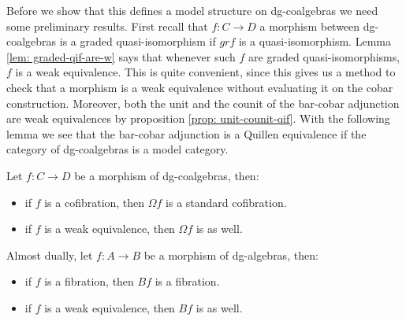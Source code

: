 \documentclass[../thesis.tex]{subfiles}
\begin{document}
            Before we show that this defines a model structure on dg-coalgebras we need some preliminary results. First recall that $f : C \rightarrow D$ a morphism between dg-coalgebras is a graded quasi-isomorphism if $grf$ is a quasi-isomorphism. Lemma \ref{lem: graded-qif-are-w} says that whenever such $f$ are graded quasi-isomorphisms, $f$ is a weak equivalence. This is quite convenient, since this gives us a method to check that a morphism is a weak equivalence without evaluating it on the cobar construction. Moreover, both the unit and the counit of the bar-cobar adjunction are weak equivalences by proposition \ref{prop: unit-counit-qif}. With the following lemma we see that the bar-cobar adjunction is a Quillen equivalence if the category of dg-coalgebras is a model category.

            \begin{lemma}\label{lem: bar-cobar-Quill-adj}
                Let $f: C\rightarrow D$ be a morphism of dg-coalgebras, then:
                \begin{itemize}
                    \item if $f$ is a cofibration, then $\Omega f$ is a standard cofibration.
                    \item if $f$ is a weak equivalence, then $\Omega f$ is as well.
                \end{itemize}

                Almost dually, let $f: A\rightarrow B$ be a morphism of dg-algebras, then:
                \begin{itemize}
                    \item if $f$ is a fibration, then $B f$ is a fibration.
                    \item if $f$ is a weak equivalence, then $B f$ is as well.
                \end{itemize}
            \end{lemma}
\end{document}
